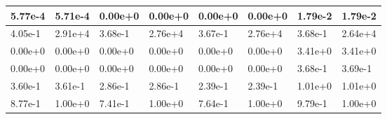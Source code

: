 \documentclass{article}
\begin{document}
 \begin{tabular}{ |l | l | l | l | l | l | l | l | }
\hline
5.77e-4 & 5.71e-4 & 0.00e+0 & 0.00e+0 & 0.00e+0 & 0.00e+0 & 1.79e-2 & 1.79e-2 \\ \hline 
4.05e-1 & 2.91e+4 & 3.68e-1 & 2.76e+4 & 3.67e-1 & 2.76e+4 & 3.68e-1 & 2.64e+4 \\ \hline 
0.00e+0 & 0.00e+0 & 0.00e+0 & 0.00e+0 & 0.00e+0 & 0.00e+0 & 3.41e+0 & 3.41e+0 \\ \hline 
0.00e+0 & 0.00e+0 & 0.00e+0 & 0.00e+0 & 0.00e+0 & 0.00e+0 & 3.68e-1 & 3.69e-1 \\ \hline 
3.60e-1 & 3.61e-1 & 2.86e-1 & 2.86e-1 & 2.39e-1 & 2.39e-1 & 1.01e+0 & 1.01e+0 \\ \hline 
8.77e-1 & 1.00e+0 & 7.41e-1 & 1.00e+0 & 7.64e-1 & 1.00e+0 & 9.79e-1 & 1.00e+0 \\ \hline 
\hline
\end{tabular}
\end{document}
